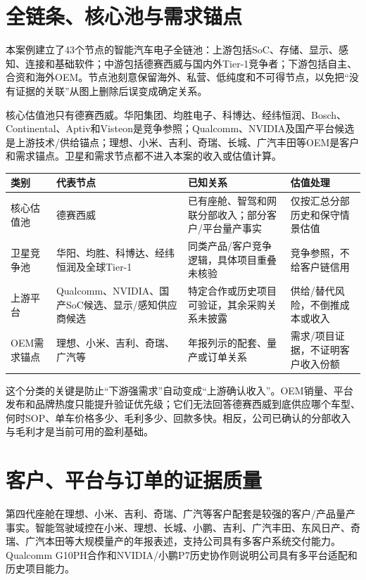 \section{全链条、核心池与需求锚点}

本案例建立了43个节点的智能汽车电子全链池：上游包括SoC、存储、显示、感知、连接和基础软件；中游包括德赛西威与国内外Tier-1竞争者；下游包括自主、合资和海外OEM。节点池刻意保留海外、私营、低纯度和不可得节点，以免把“没有证据的关联”从图上删除后误变成确定关系。

核心估值池只有德赛西威。华阳集团、均胜电子、科博达、经纬恒润、Bosch、Continental、Aptiv和Visteon是竞争参照；Qualcomm、NVIDIA及国产平台候选是上游技术/供给锚点；理想、小米、吉利、奇瑞、长城、广汽丰田等OEM是客户和需求锚点。卫星和需求节点都不进入本案的收入或估值计算。

\begin{exhibitbox}[核心、卫星与需求锚点]
\small
\begin{tabularx}{\textwidth}{L{2.4cm}Y Y Y}
\toprule
类别 & 代表节点 & 已知关系 & 估值处理 \\
\midrule
核心估值池 & 德赛西威 & 已有座舱、智驾和网联分部收入；部分客户/平台量产事实 & 仅按汇总分部历史和保守情景估值 \\
卫星竞争池 & 华阳、均胜、科博达、经纬恒润及全球Tier-1 & 同类产品/客户竞争逻辑，具体项目重叠未核验 & 竞争参照，不给客户链信用 \\
上游平台 & Qualcomm、NVIDIA、国产SoC候选、显示/感知供应商候选 & 特定合作或历史项目可验证，其余采购关系未披露 & 供给/替代风险，不倒推成本或收入 \\
OEM需求锚点 & 理想、小米、吉利、奇瑞、广汽等 & 年报列示的配套、量产或订单关系 & 需求/项目证据，不证明客户收入份额 \\
\bottomrule
\end{tabularx}
\end{exhibitbox}

这个分类的关键是防止“下游强需求”自动变成“上游确认收入”。OEM销量、平台发布和品牌热度只能提升验证优先级；它们无法回答德赛西威到底供应哪个车型、何时SOP、单车价格多少、毛利多少、回款多快。相反，公司已确认的分部收入与毛利才是当前可用的盈利基础。

\section{客户、平台与订单的证据质量}

第四代座舱在理想、小米、吉利、奇瑞、广汽等客户配套是较强的客户/产品量产事实。智能驾驶域控在小米、理想、长城、小鹏、吉利、广汽丰田、东风日产、奇瑞、广汽本田等大规模量产的年报表述，支持公司具有多客户系统交付能力。Qualcomm G10PH合作和NVIDIA/小鹏P7历史协作则说明公司具有多平台适配和历史项目能力。

